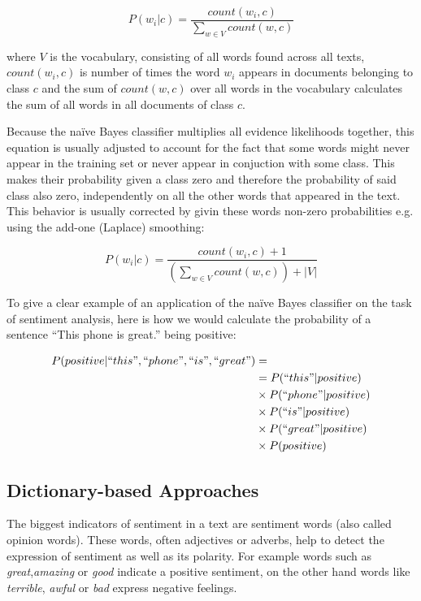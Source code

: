 $$ P(w_{i}|c) = \frac{count(w_{i},c)}{\sum_{w \in V} count(w,c)} $$

where $V$ is the vocabulary, consisting of all words found across all texts, $count(w_{i},c)$ is number of times the word $w_{i}$ appears in documents belonging to class $c$ and the sum of $count(w,c)$ over all words in the vocabulary calculates the sum of all words in all documents of class $c$.

Because the na\"ive Bayes classifier multiplies all evidence likelihoods together, this equation is usually adjusted to account for the fact that some words might never appear in the training set or never appear in conjuction with some class. This makes their probability given a class zero and therefore the probability of said class also zero, independently on all the other words that appeared in the text. This behavior is usually corrected by givin these words non-zero probabilities e.g. using the add-one (Laplace) smoothing\cite{bagofwords}:

$$ P(w_{i}|c) = \frac{count(w_{i},c) + 1}{(\sum_{w \in V} count(w,c)) + |V|} $$

To give a clear example of an application of the na\"ive Bayes classifier on the task of sentiment analysis, here is how we would calculate the probability of a sentence ``This phone is great.'' being positive:

\begin{align*}
P(positive|``this",`` phone ",``is",``great")&=\\ 
&=P(``this"|positive) \\
&\times P(``phone"|positive) \\
&\times P(``is"|positive) \\
&\times P(``great"|positive)\\
&\times P(positive)
\end{align*}

\subsection{Dictionary-based Approaches}
The biggest indicators of sentiment in a text are sentiment words (also called opinion words). These words, often adjectives or adverbs, help to detect the expression of sentiment as well as its polarity. For example words such as \textit{great},\textit{amazing} or \textit{good} indicate a positive sentiment, on the other hand words like \textit{terrible}, \textit{awful} or \textit{bad} express negative feelings. \cite{liu_2015}
  
